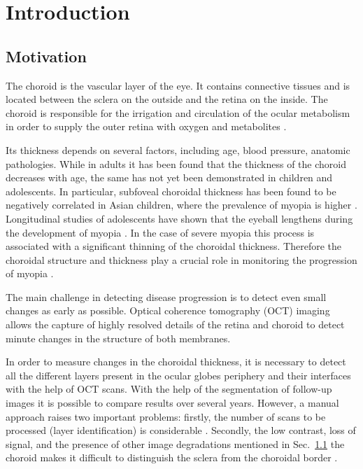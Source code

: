 \documentclass[12pt,a4paper]{scrartcl}
\begin{document}
\newpage
{}
\tableofcontents
\listofappendices


\newpage
{}

\section{Introduction}\label{s:introduction} 
\subsection{Motivation}\label{ss:motivation}
The choroid is the vascular layer of the eye. It contains connective tissues and is located between the sclera on the outside and the retina on the inside. The choroid is responsible for the irrigation and circulation of the ocular metabolism in order to supply the outer retina with oxygen and metabolites \cite{choroidExpl}.

Its thickness depends on several factors, including age, blood pressure, anatomic pathologies. While in adults it has been found that the thickness of the choroid decreases with age, the same has not yet been demonstrated in children and adolescents. In particular, subfoveal choroidal thickness has been found to be negatively correlated in Asian children, where the prevalence of myopia is higher \cite{Ronchetti2019}. Longitudinal studies of adolescents have shown that the eyeball lengthens during the development of myopia \cite{Ronchetti2018}. In the case of severe myopia this process is associated with a significant thinning of the choroidal thickness. Therefore the choroidal structure and thickness play a crucial role in monitoring the progression of myopia \cite{Ronchetti2019}.

The main challenge in detecting disease progression is to detect even small changes as early as possible. Optical coherence tomography (OCT) imaging allows the capture of highly resolved details of the retina and choroid to detect minute changes in the structure of both membranes\cite{Ronchetti2019}.

In order to measure changes in the choroidal thickness, it is necessary to detect all the different layers present in the ocular globe\textquotesingle s periphery and their interfaces with the help of OCT scans. With the help of the segmentation of follow-up images it is possible to compare results over several years. 
However, a manual approach raises two important problems: firstly, the number of scans to be processed (layer identification) is considerable \cite{Maloca2019}. Secondly, the low contrast, loss of signal, and the presence of other image degradations mentioned in Sec.~\ref{ss:motivation} the choroid makes it difficult to distinguish the sclera from the choroidal border \cite{Ronchetti2019}.
\end{document}
